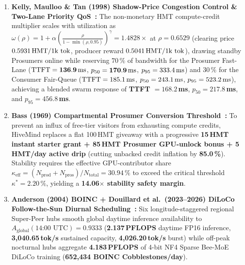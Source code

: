 \documentclass[11pt,a4paper]{article}
\begin{document}
\begin{enumerate}[leftmargin=1.8em]
    \item \textbf{Kelly, Maulloo \& Tan (1998) Shadow-Price Congestion Control \& Two-Lane Priority QoS~\cite{kelly1998rate}:} The non-monetary HMT compute-credit multiplier scales with utilization as $\omega(\rho) = 1 + \alpha\left(\frac{\rho}{1 - \min(\rho, 0.95)}\right)^\gamma = \mathbf{1.4828\times}$ at $\rho = 0.6529$ (clearing price $0.5931\text{\,HMT/1k tok}$, producer reward $0.5041\text{\,HMT/1k tok}$), drawing standby Prosumers online while reserving $70\,\%$ of bandwidth for the Prosumer Fast-Lane ($\text{TTFT} = \mathbf{136.9\text{\,ms}}$, $p_{50} = \mathbf{170.9\text{\,ms}}$, $p_{95} = 333.4\text{\,ms}$) and $30\,\%$ for the Consumer Fair-Queue ($\text{TTFT} = 185.1\text{\,ms}$, $p_{50} = 243.1\text{\,ms}$, $p_{95} = 523.2\text{\,ms}$), achieving a blended swarm response of \textbf{TTFT $= 168.2$\,ms}, \textbf{$p_{50} = 217.8$\,ms}, and \textbf{$p_{95} = 456.8$\,ms}.
    \item \textbf{Bass (1969) Compartmental Prosumer Conversion Threshold~\cite{bass1969new}:} To prevent an influx of free-tier visitors from exhausting compute credits, HiveMind replaces a flat 100\,HMT giveaway with a progressive \textbf{15\,HMT instant starter grant + 85\,HMT Prosumer GPU-unlock bonus + 5\,HMT/day active drip} (cutting unbacked credit inflation by \textbf{85.0\,\%}). Stability requires the effective GPU-contributor share $\kappa_{\text{eff}} = (N_{\text{prod}} + N_{\text{pros}})/N_{\text{total}} = \mathbf{30.94\,\%}$ to exceed the critical threshold $\kappa^* = \mathbf{2.20\,\%}$, yielding a \textbf{14.06$\times$ stability safety margin}.
    \item \textbf{Anderson (2004) BOINC + Douillard et al.\ (2023--2026) DiLoCo Follow-the-Sun Diurnal Scheduling~\cite{anderson2002boinc,douillard2023diloco,douillard2026decoupled}:} Six longitude-staggered regional Super-Peer hubs smooth global daytime inference availability to $A_{\text{global}}(14\text{:00 UTC}) = 0.9333$ (\textbf{2.137\,PFLOPS} daytime FP16 inference, \textbf{3{,}040.65\,tok/s} sustained capacity, \textbf{4{,}026.20\,tok/s} burst) while off-peak nocturnal hubs aggregate \textbf{4.183\,PFLOPS} of 4-bit NF4 Sparse Bee-MoE DiLoCo training (\textbf{652{,}434 BOINC Cobblestones/day}).
\end{enumerate}
\end{document}
